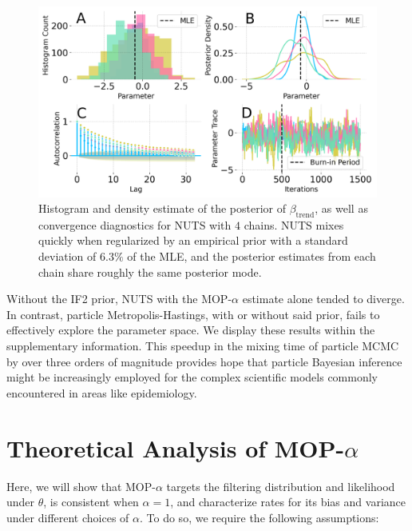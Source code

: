 \documentclass[numsec,webpdf,modern,medium,namedate]{oup-authoring-template}
\newcommand\arxiv[2]{#2} %
\theoremstyle{thmstyleone}%
\theoremstyle{thmstyletwo}%
\theoremstyle{thmstylethree}%
\begin{document}
\begin{figure}[t!]
    \centering
    \vspace{1mm}
    \includegraphics[width=\arxiv{\textwidth/\real{1.25}}{\textwidth}/\real{1.25}]{imgs/pmcmc/nuts_eb.png}
    \caption{Histogram and density estimate of the posterior of $\beta_{\text{trend}}$, as well as convergence diagnostics for NUTS with $4$ chains. NUTS mixes quickly when regularized by an empirical prior with a standard deviation of $6.3\%$ of the MLE, and the posterior estimates from each chain share roughly the same posterior mode.}
    \label{fig:nuts-eb}
    \arxiv{}{\vspace*{-4mm}}
\end{figure}

Without the IF2 prior, NUTS with the MOP-$\alpha$ estimate alone tended to diverge.
In contrast, particle Metropolis-Hastings, with or without said prior, fails to effectively explore the parameter space.
We display these results \arxiv{in Figures \ref{fig:mh} and \ref{fig:nuts} in Appendix~\ref{appendix:bayes}}{within the supplementary information}. 
This speedup in the mixing time of particle MCMC by over three orders of magnitude provides hope that particle Bayesian inference might be increasingly employed for the complex scientific models commonly encountered in areas like epidemiology.


\section{Theoretical Analysis of MOP-$\alpha$}
\label{sec:thms}

Here, we will show that MOP-$\alpha$ targets the filtering distribution and likelihood under $\theta$, is consistent when $\alpha=1$, and characterize rates for its bias and variance under different choices of $\alpha$. To do so, we require the following assumptions:
\end{document}
